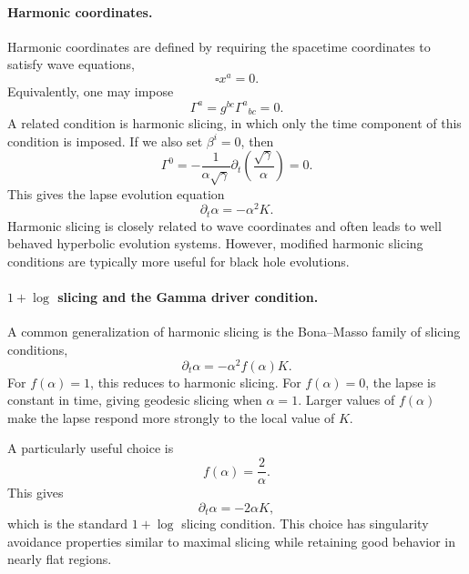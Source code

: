 \paragraph{Harmonic coordinates.}
Harmonic coordinates are defined by requiring the spacetime coordinates to satisfy wave equations,
\begin{equation}
\square x^a = 0 .
\end{equation}
Equivalently, one may impose
\begin{equation}
\Gamma^a
=
g^{bc}\Gamma^a{}_{bc}
=
0 .
\end{equation}
A related condition is harmonic slicing, in which only the time component of this condition is imposed. If we also set $\beta^i=0$, then
\begin{equation}
\Gamma^0
=
-\frac{1}{\alpha\sqrt{\gamma}}
\partial_t
\left(
\frac{\sqrt{\gamma}}{\alpha}
\right)
=
0 .
\end{equation}
This gives the lapse evolution equation
\begin{equation}
\partial_t \alpha
=
-\alpha^2 K .
\end{equation}
Harmonic slicing is closely related to wave coordinates and often leads to well behaved hyperbolic evolution systems. However, modified harmonic slicing conditions are typically more useful for black hole evolutions.


\paragraph{\boldmath $1+\log$ slicing and the Gamma driver condition.}
A common generalization of harmonic slicing is the Bona--Masso family of slicing conditions,
\begin{equation}
\partial_t \alpha
=
-\alpha^2 f(\alpha)K .
\end{equation}
For $f(\alpha)=1$, this reduces to harmonic slicing. For $f(\alpha)=0$, the lapse is constant in time, giving geodesic slicing when $\alpha=1$. Larger values of $f(\alpha)$ make the lapse respond more strongly to the local value of $K$.

A particularly useful choice is
\begin{equation}
f(\alpha)
=
\frac{2}{\alpha}.
\end{equation}
This gives
\begin{equation}
\partial_t\alpha
=
-2\alpha K,
\end{equation}
which is the standard $1+\log$ slicing condition. This choice has singularity avoidance properties similar to maximal slicing while retaining good behavior in nearly flat regions.

